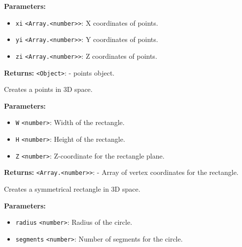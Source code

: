 \documentclass[12pt,a4paper]{article}
\begin{document}
\vspace{5mm}
\noindent {}


\noindent \textbf{Parameters:}
\begin{itemize}
  \item \texttt{xi} \texttt{<Array.<number>>}: X coordinates of points.
  \item \texttt{yi} \texttt{<Array.<number>>}: Y coordinates of points.
  \item \texttt{zi} \texttt{<Array.<number>>}: Z coordinates of points.
\end{itemize}

\noindent \textbf{Returns:} \texttt{<Object>}: - points object.

\noindent Creates a points in 3D space.

\vspace{5mm}
\noindent {}


\noindent \textbf{Parameters:}
\begin{itemize}
  \item \texttt{W} \texttt{<number>}: Width of the rectangle.
  \item \texttt{H} \texttt{<number>}: Height of the rectangle.
  \item \texttt{Z} \texttt{<number>}: Z-coordinate for the rectangle plane.
\end{itemize}

\noindent \textbf{Returns:} \texttt{<Array.<number>>}: - Array of vertex coordinates for the rectangle.

\noindent Creates a symmetrical rectangle in 3D space.

\vspace{5mm}
\noindent {}


\noindent \textbf{Parameters:}
\begin{itemize}
  \item \texttt{radius} \texttt{<number>}: Radius of the circle.
  \item \texttt{segments} \texttt{<number>}: Number of segments for the circle.
\end{itemize}
\end{document}
